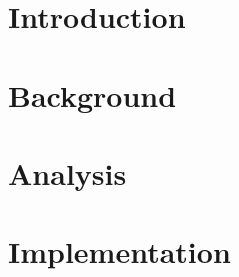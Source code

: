 




%

%



%

%












\mainmatter{}

\chapter{Introduction}\label{intro}


\chapter{Background}\label{background}


\chapter{Analysis}\label{analysis}


\chapter{Implementation}\label{implementation}


